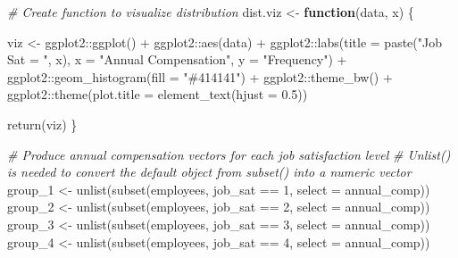 \documentclass[
]{book}
\newenvironment{Shaded}{\begin{snugshade}}{\end{snugshade}}
\newcommand{\AttributeTok}[1]{\textcolor[rgb]{0.77,0.63,0.00}{#1}}
\newcommand{\CommentTok}[1]{\textcolor[rgb]{0.56,0.35,0.01}{\textit{#1}}}
\newcommand{\ControlFlowTok}[1]{\textcolor[rgb]{0.13,0.29,0.53}{\textbf{#1}}}
\newcommand{\DecValTok}[1]{\textcolor[rgb]{0.00,0.00,0.81}{#1}}
\newcommand{\FloatTok}[1]{\textcolor[rgb]{0.00,0.00,0.81}{#1}}
\newcommand{\FunctionTok}[1]{\textcolor[rgb]{0.00,0.00,0.00}{#1}}
\newcommand{\NormalTok}[1]{#1}
\newcommand{\OtherTok}[1]{\textcolor[rgb]{0.56,0.35,0.01}{#1}}
\newcommand{\SpecialCharTok}[1]{\textcolor[rgb]{0.00,0.00,0.00}{#1}}
\newcommand{\StringTok}[1]{\textcolor[rgb]{0.31,0.60,0.02}{#1}}
\begin{document}
\begin{Shaded}
\begin{Highlighting}[]
\CommentTok{\# Create function to visualize distribution}
\NormalTok{dist.viz }\OtherTok{\textless{}{-}} \ControlFlowTok{function}\NormalTok{(data, x) \{}
  
\NormalTok{viz }\OtherTok{\textless{}{-}}\NormalTok{ ggplot2}\SpecialCharTok{::}\FunctionTok{ggplot}\NormalTok{() }\SpecialCharTok{+} 
\NormalTok{       ggplot2}\SpecialCharTok{::}\FunctionTok{aes}\NormalTok{(data) }\SpecialCharTok{+} 
\NormalTok{       ggplot2}\SpecialCharTok{::}\FunctionTok{labs}\NormalTok{(}\AttributeTok{title =} \FunctionTok{paste}\NormalTok{(}\StringTok{"Job Sat = "}\NormalTok{, x), }\AttributeTok{x =} \StringTok{"Annual Compensation"}\NormalTok{, }\AttributeTok{y =} \StringTok{"Frequency"}\NormalTok{) }\SpecialCharTok{+} 
\NormalTok{       ggplot2}\SpecialCharTok{::}\FunctionTok{geom\_histogram}\NormalTok{(}\AttributeTok{fill =} \StringTok{"\#414141"}\NormalTok{) }\SpecialCharTok{+}
\NormalTok{       ggplot2}\SpecialCharTok{::}\FunctionTok{theme\_bw}\NormalTok{() }\SpecialCharTok{+}
\NormalTok{       ggplot2}\SpecialCharTok{::}\FunctionTok{theme}\NormalTok{(}\AttributeTok{plot.title =} \FunctionTok{element\_text}\NormalTok{(}\AttributeTok{hjust =} \FloatTok{0.5}\NormalTok{))}

  \FunctionTok{return}\NormalTok{(viz)}
\NormalTok{\}}

\CommentTok{\# Produce annual compensation vectors for each job satisfaction level}
\CommentTok{\# Unlist() is needed to convert the default object from subset() into a numeric vector}
\NormalTok{group\_1 }\OtherTok{\textless{}{-}} \FunctionTok{unlist}\NormalTok{(}\FunctionTok{subset}\NormalTok{(employees, job\_sat }\SpecialCharTok{==} \DecValTok{1}\NormalTok{, }\AttributeTok{select =}\NormalTok{ annual\_comp))}
\NormalTok{group\_2 }\OtherTok{\textless{}{-}} \FunctionTok{unlist}\NormalTok{(}\FunctionTok{subset}\NormalTok{(employees, job\_sat }\SpecialCharTok{==} \DecValTok{2}\NormalTok{, }\AttributeTok{select =}\NormalTok{ annual\_comp))}
\NormalTok{group\_3 }\OtherTok{\textless{}{-}} \FunctionTok{unlist}\NormalTok{(}\FunctionTok{subset}\NormalTok{(employees, job\_sat }\SpecialCharTok{==} \DecValTok{3}\NormalTok{, }\AttributeTok{select =}\NormalTok{ annual\_comp))}
\NormalTok{group\_4 }\OtherTok{\textless{}{-}} \FunctionTok{unlist}\NormalTok{(}\FunctionTok{subset}\NormalTok{(employees, job\_sat }\SpecialCharTok{==} \DecValTok{4}\NormalTok{, }\AttributeTok{select =}\NormalTok{ annual\_comp))}


\end{Highlighting}
\end{Shaded}
\end{document}
